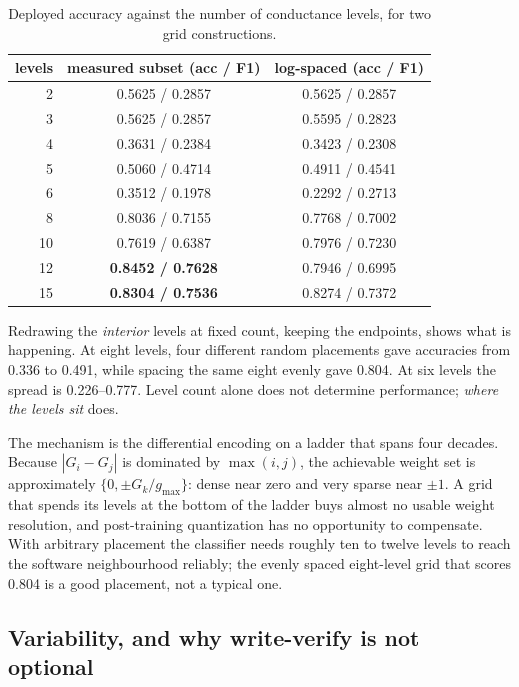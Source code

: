\begin{table}[t]
\caption{Deployed accuracy against the number of conductance levels, for two grid
constructions.}
\label{tab:levels}
\centering
\begin{tabular}{@{}rcc@{}}
\toprule
levels & measured subset (acc / F1) & log-spaced (acc / F1) \\
\midrule
2  & 0.5625 / 0.2857 & 0.5625 / 0.2857 \\
3  & 0.5625 / 0.2857 & 0.5595 / 0.2823 \\
4  & 0.3631 / 0.2384 & 0.3423 / 0.2308 \\
5  & 0.5060 / 0.4714 & 0.4911 / 0.4541 \\
6  & 0.3512 / 0.1978 & 0.2292 / 0.2713 \\
8  & 0.8036 / 0.7155 & 0.7768 / 0.7002 \\
10 & 0.7619 / 0.6387 & 0.7976 / 0.7230 \\
12 & \textbf{0.8452 / 0.7628} & 0.7946 / 0.6995 \\
15 & \textbf{0.8304 / 0.7536} & 0.8274 / 0.7372 \\
\bottomrule
\end{tabular}
\end{table}

Redrawing the \emph{interior} levels at fixed count, keeping the endpoints, shows what is
happening. At eight levels, four different random placements gave accuracies from
\num{0.336} to \num{0.491}, while spacing the same eight evenly gave \num{0.804}. At six
levels the spread is \numrange{0.226}{0.777}. Level count alone does not determine
performance; \emph{where the levels sit} does.

The mechanism is the differential encoding on a ladder that spans four decades. Because
$|G_i-G_j|$ is dominated by $\max(i,j)$, the achievable weight set is approximately
$\{0,\pm G_k/g_\mathrm{max}\}$: dense near zero and very sparse near $\pm1$. A grid that
spends its levels at the bottom of the ladder buys almost no usable weight resolution, and
post-training quantization has no opportunity to compensate. With arbitrary placement the
classifier needs roughly ten to twelve levels to reach the software neighbourhood
reliably; the evenly spaced eight-level grid that scores \num{0.804} is a good placement,
not a typical one.

\subsection{Variability, and why write-verify is not optional}
\label{sec:variability}

